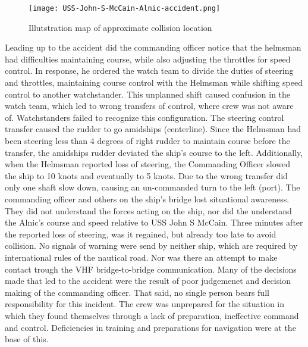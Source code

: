 \begin{figure}[H]
	\centering
	\texttt{[image: USS-John-S-McCain-Alnic-accident.png]}
	\caption{Illutstration map of approximate collision location}
	\label{fig:Accident-USS-John-S-McCain-Alnic}
\end{figure}

Leading up to the accident did the commanding officer notice that the helmsman had difficulties maintaining course, while also adjusting the throttles for speed control. In response, he ordered the watch team to divide the duties of steering and throttles, maintaining course control with the Helmsman while shifting speed control to another watchstander. This unplanned shift caused confusion in the watch team, which led to wrong transfers of control, where crew was not aware of. 
Watchstanders failed to recognize this configuration. The steering control transfer caused the rudder to go amidships (centerline). Since the Helmsman had been steering less than 4 degrees of right rudder to maintain course before the transfer, the amidships rudder deviated the ship’s course to the left. Additionally, when the Helmsman reported loss of steering, the Commanding Officer slowed the ship to 10 knots and eventually to 5 knots. Due to the wrong transfer did only one shaft slow down, causing an un-commanded turn to the left (port). The commanding officer and others on the ship's bridge lost situational awareness. They did not understand the forces acting on the ship, nor did the understand the Alnic's course and speed relative to USS John S McCain. Three minutes after the reported loss of steering, was it regained, but already too late to avoid collision. No signals of warning were send by neither ship, which are required by international rules of the nautical road. Nor was there an attempt to make contact trough the \ac{VHF} bridge-to-bridge communication.
Many of the decisions made that led to the accident were the result of poor judgemenet and decision making of the commanding officer. That said, no single person bears full responsibility for this incident. The crew was unprepared for the situation in which they found themselves through a lack of preparation, ineffective command and control. Deficiencies in training and preparations for navigation were at the base of this. \cite{USSNavy2017}